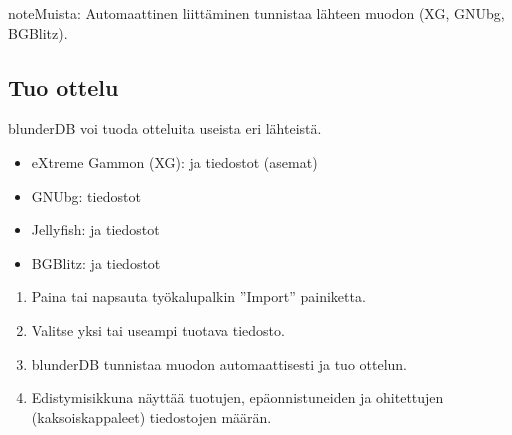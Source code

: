 \documentclass[letterpaper,10pt,finnish]{sphinxmanual}
\begin{document}
\begin{sphinxadmonition}{note}{Muista:}
\sphinxAtStartPar
Automaattinen liittäminen tunnistaa lähteen muodon (XG, GNUbg, BGBlitz).
\end{sphinxadmonition}


\subsection{Tuo ottelu}
\label{\detokenize{guide_utilisateur:importer-un-match}}
\sphinxAtStartPar
blunderDB voi tuoda otteluita useista eri lähteistä.

\sphinxAtStartPar
{}
\begin{itemize}
\item {} 
\sphinxAtStartPar
eXtreme Gammon (XG): \sphinxhyphen{} ja \sphinxhyphen{}tiedostot (asemat)

\item {} 
\sphinxAtStartPar
GNUbg: \sphinxhyphen{}tiedostot

\item {} 
\sphinxAtStartPar
Jellyfish: \sphinxhyphen{} ja \sphinxhyphen{}tiedostot

\item {} 
\sphinxAtStartPar
BGBlitz: \sphinxhyphen{} ja \sphinxhyphen{}tiedostot

\end{itemize}

\sphinxAtStartPar
{}
\begin{enumerate}
%
\item {} 
\sphinxAtStartPar
Paina  tai napsauta työkalupalkin ”Import” \sphinxhyphen{}painiketta.

\item {} 
\sphinxAtStartPar
Valitse yksi tai useampi tuotava tiedosto.

\item {} 
\sphinxAtStartPar
blunderDB tunnistaa muodon automaattisesti ja tuo ottelun.

\item {} 
\sphinxAtStartPar
Edistymisikkuna näyttää tuotujen, epäonnistuneiden ja ohitettujen (kaksoiskappaleet) tiedostojen määrän.

\end{enumerate}
\end{document}
